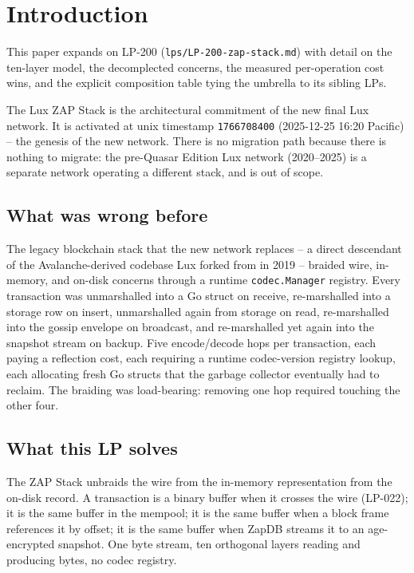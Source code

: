 \section{Introduction}

This paper expands on LP-200 (\texttt{lps/LP-200-zap-stack.md}) with
detail on the ten-layer model, the decomplected concerns, the measured
per-operation cost wins, and the explicit composition table tying the
umbrella to its sibling LPs.

The Lux ZAP Stack is the architectural commitment of the new final Lux
network. It is activated at unix timestamp \texttt{1766708400}
(2025-12-25 16:20 Pacific) -- the genesis of the new network. There is
no migration path because there is nothing to migrate: the pre-Quasar
Edition Lux network (2020--2025) is a separate network operating a
different stack, and is out of scope.

\subsection{What was wrong before}

The legacy blockchain stack that the new network replaces -- a
direct descendant of the Avalanche-derived codebase Lux forked from in
2019 -- braided wire, in-memory, and on-disk concerns through a
runtime \texttt{codec.Manager} registry. Every transaction was
unmarshalled into a Go struct on receive, re-marshalled into a
storage row on insert, unmarshalled again from storage on read,
re-marshalled into the gossip envelope on broadcast, and re-marshalled
yet again into the snapshot stream on backup. Five encode/decode
hops per transaction, each paying a reflection cost, each requiring a
runtime codec-version registry lookup, each allocating fresh Go
structs that the garbage collector eventually had to reclaim. The
braiding was load-bearing: removing one hop required touching the
other four.

\subsection{What this LP solves}

The ZAP Stack unbraids the wire from the in-memory representation
from the on-disk record. A transaction is a binary buffer when it
crosses the wire (LP-022); it is the same buffer in the mempool; it
is the same buffer when a block frame references it by offset; it is
the same buffer when ZapDB streams it to an age-encrypted snapshot.
One byte stream, ten orthogonal layers reading and producing bytes,
no codec registry.

